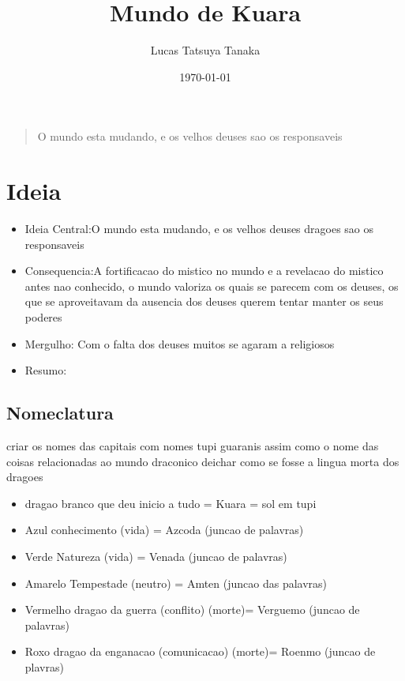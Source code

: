 \documentclass{book}
\title{Mundo de Kuara}
\author{Lucas Tatsuya Tanaka}
\date{\today}
\begin{document}
\maketitle
\tableofcontents

\vspace*{\fill} 
\begin{quote} 
\centering 
\Large O mundo esta mudando, e os velhos deuses sao os responsaveis
\end{quote}
\vspace*{\fill}

\tableofcontents
\part{Ideia}
\begin{itemize}
    \item Ideia Central:O mundo esta mudando, e os velhos deuses dragoes sao os responsaveis
    \item Consequencia:A fortificacao do mistico no mundo e a revelacao do mistico antes nao 
        conhecido, o mundo valoriza os quais se parecem com os deuses, os que se aproveitavam 
        da ausencia dos deuses querem tentar manter os seus poderes 
    \item Mergulho: Com o falta dos deuses muitos se agaram a religiosos 
    \item Resumo:
\end{itemize}

\chapter{Nomeclatura}

criar os nomes das capitais com nomes tupi guaranis assim como o nome das coisas relacionadas ao
mundo draconico deichar como se fosse a lingua morta dos dragoes 

\begin{itemize}
      \item  dragao branco que deu inicio a tudo = Kuara = sol em tupi
      \item  Azul conhecimento (vida) =  Azcoda (juncao de palavras)
      \item  Verde Natureza (vida) = Venada (juncao de palavras)
      \item  Amarelo Tempestade (neutro) = Amten (juncao das palavras)
      \item  Vermelho dragao da guerra (conflito) (morte)= Verguemo (juncao de palavras)
      \item  Roxo dragao da enganacao (comunicacao) (morte)= Roenmo (juncao de plavras)
\end{itemize}
\end{document}
